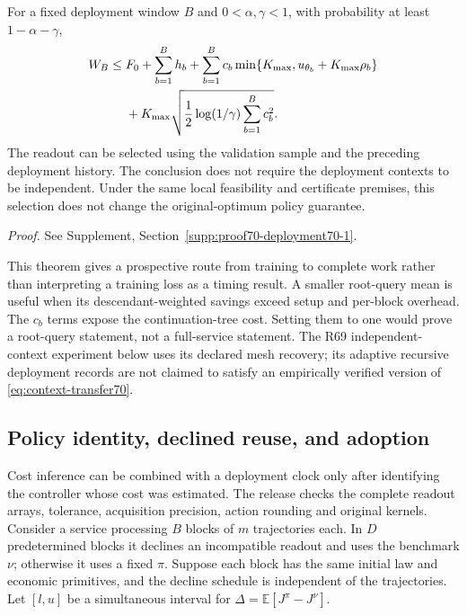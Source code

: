\begin{theorem}\label{thm:deployment70}
For a fixed deployment window $B$ and $0<\alpha,\gamma<1$, with probability at least $1-\alpha-\gamma$,
\begin{align}\label{eq:deployment-work70}
 W_B\le {}&F_0+\sum_{b=1}^B h_b
 +\sum_{b=1}^Bc_b\min\{K_{\max},u_{\theta_b}+K_{\max}\rho_b\}\notag\\
 &+K_{\max}\sqrt{\frac12\log(1/\gamma)\sum_{b=1}^Bc_b^2}.
\end{align}
The readout can be selected using the validation sample and the preceding deployment history. The conclusion does not require the deployment contexts to be independent. Under the same local feasibility and certificate premises, this selection does not change the original-optimum policy guarantee.
\end{theorem}
\noindent\emph{Proof.} See Supplement, Section~\ref{supp:proof70-deployment70-1}.


This theorem gives a prospective route from training to complete work rather than interpreting a training loss as a timing result. A smaller root-query mean is useful when its descendant-weighted savings exceed setup and per-block overhead. The $c_b$ terms expose the continuation-tree cost. Setting them to one would prove a root-query statement, not a full-service statement. The R69 independent-context experiment below uses its declared mesh recovery; its adaptive recursive deployment records are not claimed to satisfy an empirically verified version of \eqref{eq:context-transfer70}.

\subsection{Policy identity, declined reuse, and adoption}
Cost inference can be combined with a deployment clock only after identifying the controller whose cost was estimated. The release checks the complete readout arrays, tolerance, acquisition precision, action rounding and original kernels. Consider a service processing $B$ blocks of $m$ trajectories each. In $D$ predetermined blocks it declines an incompatible readout and uses the benchmark $\nu$; otherwise it uses a fixed $\pi$. Suppose each block has the same initial law and economic primitives, and the decline schedule is independent of the trajectories. Let $[l,u]$ be a simultaneous interval for $\Delta=\mathbb E[J^\pi-J^\nu]$.

